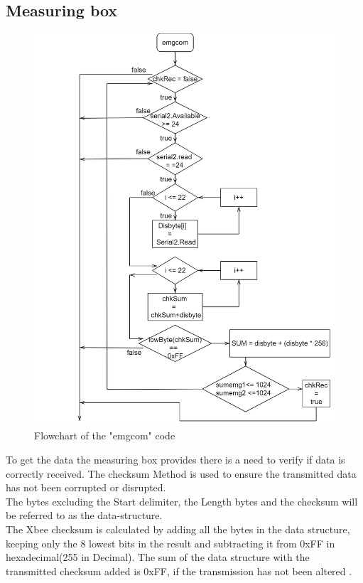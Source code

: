 \subsection*{Measuring box}
\begin{figure}[H]
    \centering
    \includegraphics[width=\textwidth]{Figures/Technical_figures/emgcom.png}
    \caption{Flowchart of the "emgcom" code}
    \label{fig:emgcom}
\end{figure}
To get the data the measuring box provides there is a need to verify if data is correctly received.
The checksum Method is used to ensure the transmitted data has not been corrupted or disrupted.\\
The bytes excluding the Start delimiter, the Length bytes and the checksum will be referred to as the data-structure.\\
The Xbee checksum is calculated by adding all the bytes in the data structure, keeping only the 8 lowest bits in the result and subtracting it from 0xFF in hexadecimal(255 in Decimal)\cite{Calculat82:online}.
The sum of the data structure with the transmitted checksum added is 0xFF, if the transmission has not been altered \cite{XbeeManual:online}.

